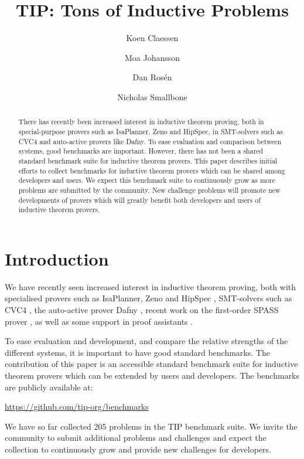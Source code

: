 \documentclass{llncs}
\begin{document}
\title{TIP: Tons of Inductive Problems}

\author{Koen Claessen \and Moa Johansson \and Dan Ros\'en \and Nicholas Smallbone}

\titlerunning{}

\maketitle

\begin{abstract}
There has recently been increased interest in inductive theorem
proving, both in special-purpose provers such as
IsaPlanner, Zeno and HipSpec, in SMT-solvers such as
CVC4 and auto-active provers like Dafny. To ease evaluation and comparison between systems,
good benchmarks are important. However, there has not been a shared
standard benchmark suite for inductive theorem provers. This paper
describes initial efforts to collect benchmarks for inductive theorem
provers which can be shared among developers and users.
We expect this benchmark suite to continuously grow as
more problems are submitted by the community. New challenge problems
will promote new developments of provers which will greatly benefit
both developers and users of inductive theorem provers.

\end{abstract}

\section{Introduction}

We have recently seen increased interest in inductive theorem proving, both with specialised provers such as IsaPlanner, Zeno and HipSpec \cite{hipspecCADE,dixon2007isaplanner,zeno}, SMT-solvers such as CVC4 \cite{cvc4}, the auto-active prover Dafny \cite{dafny}, recent work on the first-order SPASS prover \cite{SPASSInduction}, as well as some support in proof assistants \cite{hipster,acl2}.

To ease evaluation and development, and compare the relative strengths of the different systems, it is important to have good standard benchmarks. The contribution of this paper is an accessible standard benchmark suite for inductive theorem provers which can be extended by users and developers. The benchmarks are publicly available at:
\begin{center}
\url{https://github.com/tip-org/benchmarks}
\end{center}
We have so far collected 205 problems in the TIP benchmark suite. We invite the community to submit additional problems and challenges and expect the collection to continuously grow and provide new challenges for developers.
\end{document}
